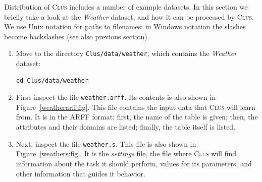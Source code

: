 \documentclass[a4paper]{report}
\newcommand{\clus}{\textsc{Clus}}
\begin{document}
Distribution of \clus{} includes a number of example datasets.  In this section we briefly take a look at the {\em Weather} dataset, and how it can be processed by \clus{}.  We use Unix notation for paths to filenames; in Windows notation the slashes become backslashes (see also previous section).
\begin{enumerate}
  \item Move to the directory {\tt Clus/data/weather}, which contains the {\em Weather} dataset:
\begin{verbatim}
cd Clus/data/weather
\end{verbatim}

  \item First inspect the file {\tt weather.arff}.  Its contents is also shown in Figure~\ref{weatherarff:fig}.
This file contains the input data that \clus{} will learn from.  It is in the ARFF format: first, the name of the table is given; then, the attributes and their domains are listed; finally, the table itself is listed.

  \item Next, inspect the file {\tt weather.s}.  This file is also shown in Figure~\ref{weathers:fig}.  
It is the {\em settings} file, the file where \clus{} will find information about the task it should perform, values for its parameters, and other information that guides it behavior.



\end{enumerate}
\end{document}
